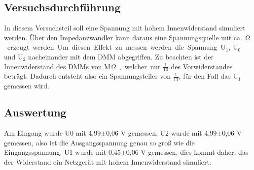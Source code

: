 \documentclass[12pt,a4paper]{article}
\begin{document}
\subsection{Versuchsdurchführung}
In diesem Versuchsteil soll eine Spannung mit hohem Innenwiderstand simuliert werden. Über den Impedanzwandler kann daraus eine Spannungsquelle mit ca. \unit[100]{$\Omega$} erzeugt werden. Um diesen Effekt zu messen werden die Spannung U$_1$, U$_0$ und U$_2$ nacheinander mit dem DMM abgegriffen. Zu beachten ist der Innenwiderstand des DMMs von \unit[1]{M$\Omega$}, welcher nur $\frac{1}{10}$ des Vorwiderstandes beträgt. Dadurch entsteht also ein Spannungsteiler von $\frac{1}{11}$, für den Fall das U$_1$ gemessen wird.
\subsection{Auswertung}

Am Eingang wurde U0 mit 4,99$\pm$0,06 V gemessen, U2 wurde mit 4,99$\pm$0,06 V gemessen, also ist die Ausgangsspannung genau so groß wie die Eingangsspannung. U1 wurde mit 0,45$\pm$0,06 V gemessen, dies kommt daher, das der Widerstand ein Netzgerät mit hohem Innenwiderstand simuliert.
\end{document}
